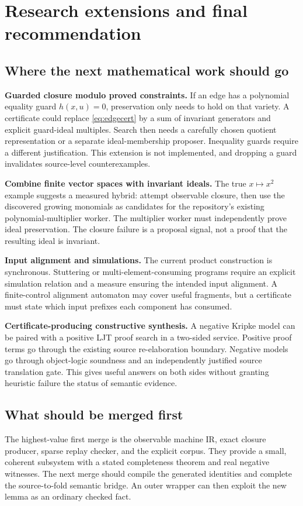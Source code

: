 \section{Research extensions and final recommendation}

\subsection{Where the next mathematical work should go}
\textbf{Guarded closure modulo proved constraints.} If an edge has a polynomial
equality guard $h(x,u)=0$, preservation only needs to hold on that variety. A
certificate could replace \eqref{eq:edgecert} by a sum of invariant generators
and explicit guard-ideal multiples. Search then needs a carefully chosen
quotient representation or a separate ideal-membership proposer. Inequality
guards require a different justification. This extension is not implemented,
and dropping a guard invalidates source-level counterexamples.

\textbf{Combine finite vector spaces with invariant ideals.} The true
$x\mapsto x^2$ example suggests a measured hybrid: attempt observable closure,
then use the discovered growing monomials as candidates for the repository's
existing polynomial-multiplier worker. The multiplier worker must independently
prove ideal preservation. The closure failure is a proposal signal, not a proof
that the resulting ideal is invariant.

\textbf{Input alignment and simulations.} The current product construction is
synchronous. Stuttering or multi-element-consuming programs require an explicit
simulation relation and a measure ensuring the intended input alignment. A
finite-control alignment automaton may cover useful fragments, but a certificate
must state which input prefixes each component has consumed.

\textbf{Certificate-producing constructive synthesis.} A negative Kripke model
can be paired with a positive LJT proof search in a two-sided service. Positive
proof terms go through the existing source re-elaboration boundary. Negative
models go through object-logic soundness and an independently justified source
translation gate. This gives useful answers on both sides without granting
heuristic failure the status of semantic evidence.

\subsection{What should be merged first}
The highest-value first merge is the observable machine IR, exact closure
producer, sparse replay checker, and the explicit corpus. They provide a
small, coherent subsystem with a stated completeness theorem and real
negative witnesses. The next merge should compile the generated identities and
complete the source-to-fold semantic bridge. An outer  wrapper can
then exploit the new lemma as an ordinary checked fact.

